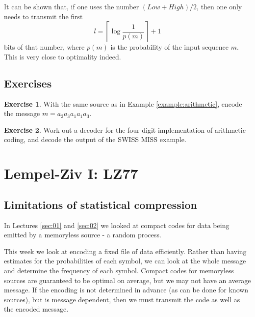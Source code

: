 \documentclass[a4paper, 11pt]{article}
\numberwithin{equation}{section}
\theoremstyle{plain}
\theoremstyle{definition}
\newtheorem{exercise}   {Exercise}  [section]
\begin{document}
It can be shown that, if one uses the number $(Low + High)/2$, then one only needs to transmit the first
\[
    l = \left\lceil \log \frac{1}{p(m)} \right\rceil + 1
\]
bits of that number, where $p(m)$ is the probability of the input sequence $m$. This is very close to optimality indeed.

\subsection{Exercises}

\begin{exercise} \label{exercise:arithmetic}
With the same source as in Example \ref{example:arithmetic}, encode the message $m = a_2a_3a_1a_1a_3$.
\end{exercise}



\begin{exercise} \label{exercise:swiss_miss}
Work out a decoder for the four-digit implementation of arithmetic coding, and decode the output of the SWISS MISS example.
\end{exercise}





\section{Lempel-Ziv I: LZ77}
\label{sec:03}


\subsection{Limitations of statistical compression}

In Lectures \ref{sec:01} and \ref{sec:02} we looked at compact codes for data being emitted by a memoryless source - a random process.

This week we look at encoding a fixed file of data efficiently. Rather than having estimates for the probabilities of each symbol, we can look at the whole message and determine the frequency of each symbol. Compact codes for memoryless sources are guaranteed to be optimal on average, but we may not have an average message. If the encoding is not determined in advance (as can be done for known sources), but is message dependent, then we must transmit the code as well as the encoded message.
\end{document}
